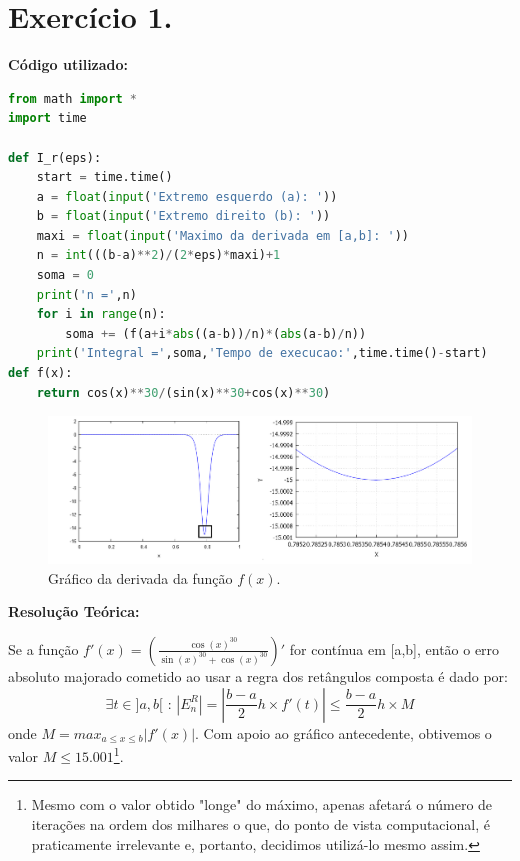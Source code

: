 \documentclass{article}
\begin{document}
\section*{Exercício 1.}
\textbf{Código utilizado:}
\begin{lstlisting}[language=Python]
from math import *
import time

def I_r(eps):
    start = time.time()
    a = float(input('Extremo esquerdo (a): '))
    b = float(input('Extremo direito (b): '))
    maxi = float(input('Maximo da derivada em [a,b]: '))
    n = int(((b-a)**2)/(2*eps)*maxi)+1
    soma = 0
    print('n =',n)
    for i in range(n):
        soma += (f(a+i*abs((a-b))/n)*(abs(a-b)/n))
    print('Integral =',soma,'Tempo de execucao:',time.time()-start)
def f(x):
    return cos(x)**30/(sin(x)**30+cos(x)**30)
\end{lstlisting}
\newpage
{}
\begin{figure}[H]
  \begin{center}
    \includegraphics[scale = 0.47]{figure1.png}
    \caption*{Gráfico da derivada da função $f(x)$.}
  \end{center}
\end{figure}
\begin{flushleft}
  \textbf{Resolução Teórica:}
\end{flushleft}
\hspace{10mm}Se a função $f'(x) = (\frac{\cos(x)^{30}}{\sin(x)^{30}+\cos(x)^{30}})' $ for contínua em [a,b], então o erro absoluto majorado cometido ao usar a regra dos retângulos composta é dado por: $$\exists t\in]a,b[\text{ : } \left|E_{n}^{R}\right| = \left|\frac{b-a}{2}h\times f'(t)\right| \leq \frac{b-a}{2}h\times M $$ onde $M = max_{a\leq x \leq b}|f'(x)|$.
Com apoio ao gráfico antecedente, obtivemos o valor $M \leq 15.001$\footnote{Mesmo com o valor obtido "longe" do máximo, apenas afetará o número de iterações na ordem dos milhares o que, do ponto de vista computacional, é praticamente irrelevante e, portanto, decidimos utilizá-lo mesmo assim.}.\\[5mm]
\end{document}
